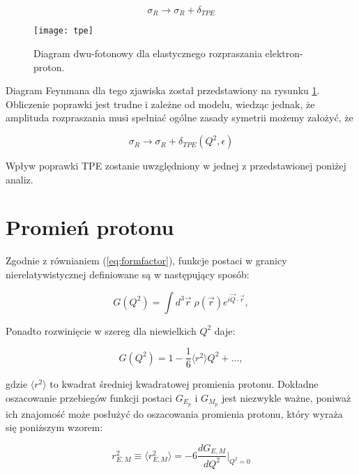 \documentclass[11pt]{book}
\theoremstyle{definition}
\begin{document}
\begin{equation}
\sigma_R \rightarrow \sigma_R + \delta_{TPE}
\end{equation}

%
\begin{figure}[htp!]
	\centering
	\texttt{[image: tpe]}
	\caption{Diagram dwu-fotonowy dla elastycznego rozpraszania elektron-proton.} 
	\label{fig:tpe}
\end{figure}


Diagram Feynmana dla tego zjawiska został przedstawiony na rysunku \ref{fig:tpe}. Obliczenie poprawki jest trudne i zależne od modelu, wiedząc jednak, że amplituda rozpraszania musi spełniać ogólne zasady symetrii możemy założyć, że 

\begin{equation}
\sigma_R \rightarrow \sigma_R + \delta_{TPE}\left(Q^2, \epsilon\right)
\end{equation}

Wpływ poprawki TPE zostanie uwzględniony w jednej z przedstawionej poniżej analiz. 

\section{Promień protonu}

Zgodnie z równianiem (\ref{eq:formfactor}), funkcje postaci w granicy nierelatywistycznej definiowane są w następujący sposób:

\begin{equation*}
G(Q^2) = \int d^3 \vec{r} \; \rho(\vec{r}) e^{i\vec{Q}\cdot \vec{r}} ,
\end{equation*}

Ponadto rozwinięcie w szereg dla niewielkich $Q^2$ daje:

\begin{equation}
G(Q^2) = 1 - \frac{1}{6}\langle r^2 \rangle Q^2 + \dots,
\end{equation}

gdzie $\langle r^2 \rangle$ to kwadrat średniej kwadratowej promienia protonu. 
Dokładne oszacowanie przebiegów funkcji postaci $G_{E_p}$ i $G_{M_p}$ jest niezwykle ważne, poniważ ich znajomość może posłużyć do oszacowania promienia protonu, który wyraża się poniższym wzorem: 



\begin{equation}
r_{E,M}^2 \equiv \langle r_{E,M}^2  \rangle = -6 \frac{d G_{E,M}}{d Q^2} \biggr\rvert_{Q^2 = 0}
\end{equation}
\end{document}
